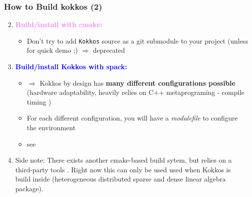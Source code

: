 \begin{frame}
   \frametitle{How to Build kokkos (2)}

   \begin{enumerate}
      \setcounter{enumi}{1}
   \item \textcolor{violet}{\bf Build/install with cmake:} \\
      \begin{itemize}
      \item Don't try to add {\tt Kokkos} source as a git submodule to your project (unless for quick demo ;) $\Rightarrow$ deprecated
      \end{itemize}
   \item \textcolor{blue}{\textbf{Build/install Kokkos with spack:}}
      \begin{itemize}
      \item $\Rightarrow$ Kokkos by design has {\bf many different configurations possible} (hardware adaptability, heavily relies on C++ metaprograming - compile timing )
      \item For each different configuration, you will have a \textit{modulefile} to configure the environment
      \item see 
      \end{itemize}
   \item Side note: There exists another cmake-based build sytem, but relies on a third-party tools . Right now this can only be used used when Kokkos is build inside  (heterogeneous distributed sparse and dense linear algebra package).
  \end{enumerate}

\end{frame}

